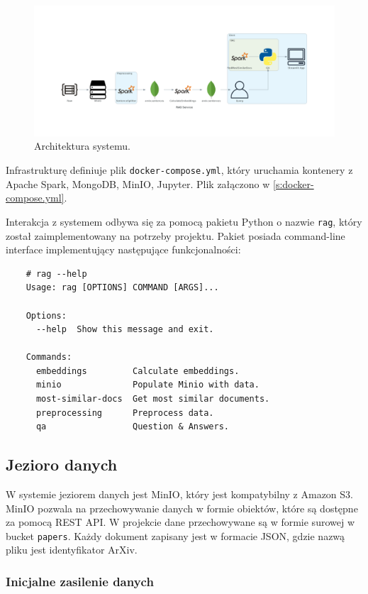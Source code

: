 \documentclass[10pt]{article}
\begin{document}
\begin{figure}[h]
    \centering
    \includegraphics[width=1.0\textwidth]{images/architecture.png}
    \caption{Architektura systemu.}
    \label{fig:architecture}
\end{figure}

Infrastrukturę definiuje plik \texttt{docker-compose.yml}, który uruchamia kontenery z Apache Spark, MongoDB, MinIO, Jupyter. Plik załączono w \ref{s:docker-compose.yml}.

Interakcja z systemem odbywa się za pomocą pakietu Python o nazwie \texttt{rag}, który został zaimplementowany na potrzeby projektu. Pakiet posiada command-line interface implementujący następujące funkcjonalności:

\begin{lstlisting}
    # rag --help
    Usage: rag [OPTIONS] COMMAND [ARGS]...
    
    Options:
      --help  Show this message and exit.
    
    Commands:
      embeddings         Calculate embeddings.
      minio              Populate Minio with data.
      most-similar-docs  Get most similar documents.
      preprocessing      Preprocess data.
      qa                 Question & Answers.
\end{lstlisting}

\subsection{Jezioro danych}

W systemie jeziorem danych jest MinIO, który jest kompatybilny z Amazon S3. MinIO pozwala na przechowywanie danych w formie obiektów, które są dostępne za pomocą REST API. W projekcie dane przechowywane są w formie surowej w bucket \texttt{papers}. Każdy dokument zapisany jest w formacie JSON, gdzie nazwą pliku jest identyfikator ArXiv.

\subsubsection{Inicjalne zasilenie danych}
\end{document}
